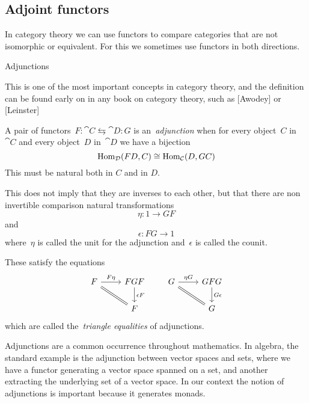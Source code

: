 \documentclass[../TFG.tex]{subfiles}
\begin{document}
\subsection{Adjoint functors}
In category theory we can use functors to compare categories that are not
isomorphic or equivalent. For this we sometimes use functors in both directions.

Adjunctions

This is one of the most important concepts in category theory, and
the definition can be found early on in any book on category theory,
such as [Awodey] or [Leinster]


\begin{definition}[Adjunction]
A pair of functors~\(F:\cat{C}\leftrightarrows\cat{D}:G\) is
an~\emph{adjunction} when for every object~\(C\) in~\(\cat{C}\) and every
object~\(D\) in~\(\cat{D}\) we have a bijection
\[
    \operatorname{Hom}_{\mathcal{D}}(FD, C) \cong \operatorname{Hom}_{\mathcal{C}}(D, GC)
\]
This must be natural both in $C$ and in $D$.
\end{definition}

This does not imply that they are inverses to each other, but that there are non
invertible comparison natural transformations
\[
    \eta:1\longrightarrow GF
\]
and
\[
    \epsilon:FG\longrightarrow 1
\]
where~\(\eta\) is called the unit for the adjunction and~\(\epsilon\) is called
the counit.

These satisfy the equations
\[
    \begin{tikzcd}
        F \arrow[r, "F\eta", rightarrow] \arrow[dr, equal] & FGF \arrow[d, "\epsilon F", rightarrow] \\
                                                           & F
    \end{tikzcd}
    \qquad
    \begin{tikzcd}
        G \arrow[r, "\eta G", rightarrow] \arrow[dr, equal] & GFG \arrow[d, "G\epsilon", rightarrow] \\
                                                            & G
    \end{tikzcd}
\]
which are called the~\emph{triangle equalities} of adjunctions.

Adjunctions are a common occurrence throughout mathematics. In algebra, the
standard example is the adjunction between vector spaces and sets, where we have
a functor generating a vector space spanned on a set, and another extracting the
underlying set of a vector space. In our context the notion of adjunctions is
important because it generates monads.
\end{document}
